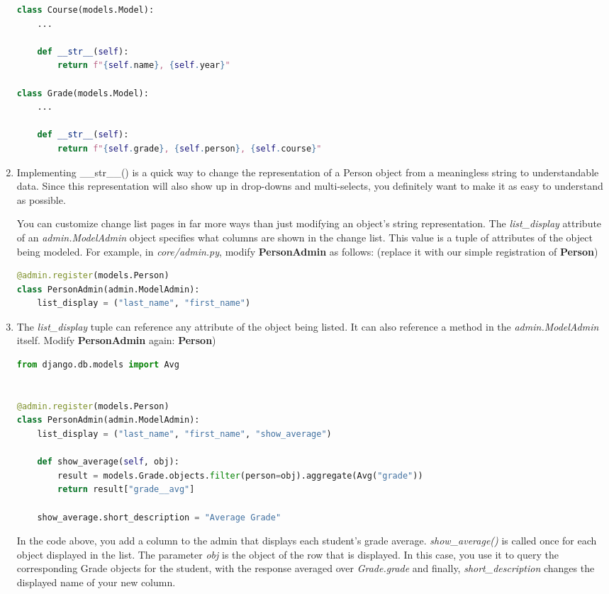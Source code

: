 \documentclass{homework}
\begin{document}
\begin{enumerate}[label=\roman*)]
\begin{lstlisting}[language=python]
class Course(models.Model):
    ...

    def __str__(self):
        return f"{self.name}, {self.year}"

class Grade(models.Model):
    ...

    def __str__(self):
        return f"{self.grade}, {self.person}, {self.course}"
\end{lstlisting}
    \item Implementing \_\_str\_\_() is a quick way to change the representation of a Person object from a meaningless string to understandable data. Since this representation will also show up in drop-downs and multi-selects, you definitely want to make it as easy to understand as possible.
    
    You can customize change list pages in far more ways than just modifying an object’s string representation. The \textit{list\_display} attribute of an \textit{admin.ModelAdmin} object specifies what columns are shown in the change list. This value is a tuple of attributes of the object being modeled. For example, in \textit{core/admin.py}, modify \textbf{PersonAdmin} as follows: (replace it with our simple registration of \textbf{Person})
    \begin{lstlisting}[language=python]
@admin.register(models.Person)
class PersonAdmin(admin.ModelAdmin):
    list_display = ("last_name", "first_name")
\end{lstlisting}
    \item The \textit{list\_display} tuple can reference any attribute of the object being listed. It can also reference a method in the \textit{admin.ModelAdmin} itself. Modify \textbf{PersonAdmin} again:
    \textbf{Person})
    \begin{lstlisting}[language=python]
from django.db.models import Avg


@admin.register(models.Person)
class PersonAdmin(admin.ModelAdmin):
    list_display = ("last_name", "first_name", "show_average")

    def show_average(self, obj):
        result = models.Grade.objects.filter(person=obj).aggregate(Avg("grade"))
        return result["grade__avg"]

    show_average.short_description = "Average Grade"
\end{lstlisting}
    
    In the code above, you add a column to the admin that displays each student’s grade average. \textit{show\_average()} is called once for each object displayed in the list. The parameter \textit{obj} is the object of the row that is displayed. In this case, you use it to query the corresponding Grade objects for the student, with the response averaged over \textit{Grade.grade} and finally, \textit{short\_description} changes the displayed name of your new column.


\end{enumerate}
\end{document}
